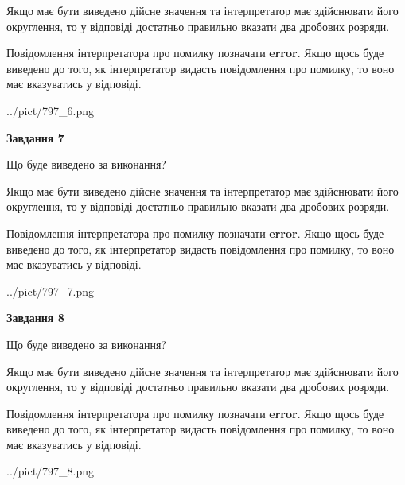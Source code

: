 \documentclass[12pt, ukrainian]{article}
\begin{document}
{\begin {Large}
Якщо має бути виведено дійсне значення та інтерпретатор має здійснювати його округлення, 
то у відповіді достатньо правильно вказати два дробових розряди.

Повідомлення інтерпретатора про помилку позначати \textbf{error}.
Якщо щось буде виведено до того, як інтерпретатор видасть повідомлення про помилку, 
то воно має вказуватись у відповіді. \par

\begin{center}
	{../pict/797_6.png}
\end{center}
\newpage

{\begin {center}\textbf{Завдання 7}\end {center}}\par
Що буде виведено за виконання? \par

Якщо має бути виведено дійсне значення та інтерпретатор має здійснювати його округлення, 
то у відповіді достатньо правильно вказати два дробових розряди.

Повідомлення інтерпретатора про помилку позначати \textbf{error}.
Якщо щось буде виведено до того, як інтерпретатор видасть повідомлення про помилку, 
то воно має вказуватись у відповіді. \par

\begin{center}
	{../pict/797_7.png}
\end{center}
\newpage

{\begin {center}\textbf{Завдання 8}\end {center}}\par
Що буде виведено за виконання? \par

Якщо має бути виведено дійсне значення та інтерпретатор має здійснювати його округлення, 
то у відповіді достатньо правильно вказати два дробових розряди.

Повідомлення інтерпретатора про помилку позначати \textbf{error}.
Якщо щось буде виведено до того, як інтерпретатор видасть повідомлення про помилку, 
то воно має вказуватись у відповіді. \par

\begin{center}
	{../pict/797_8.png}
\end{center}
\newpage


\end{Large}}
\end{document}
